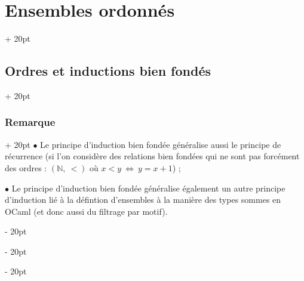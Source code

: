 \documentclass[a4paper, 12pt, twoside]{article}
\newcommand{\N}{\mathbb{N}} %
\newcommand{\ssi}{\ \Leftrightarrow \ }
\newcommand{\ind}[1][20pt]{\advance\leftskip + #1}
\newcommand{\deind}[1][20pt]{\advance\leftskip - #1}
\newenvironment{indt}[2][20pt]{#2 \par \ind[#1]}{\par \deind} %
\begin{document}
\begin{indt}{\section{Ensembles ordonnés}}
\begin{indt}{\subsection{Ordres et inductions bien fondés}}
\begin{indt}{\subsubsection{Remarque}}
                $\bullet$ Le principe d'induction bien fondée généralise aussi le principe de récurrence (si l'on considère des relations bien fondées qui ne sont pas forcément des ordres : $(\N,\ <)$ où $x < y \ssi y = x + 1$) ;
                
                \vspace{6pt}
                
                $\bullet$ Le principe d'induction bien fondée généralise également un autre principe d'induction lié à la défintion d'ensembles à la manière des types sommes en OCaml (et donc aussi du filtrage par motif).
            \end{indt}
        \end{indt}
        
    \end{indt}
    
    \vspace{12pt}
    
\end{document}
